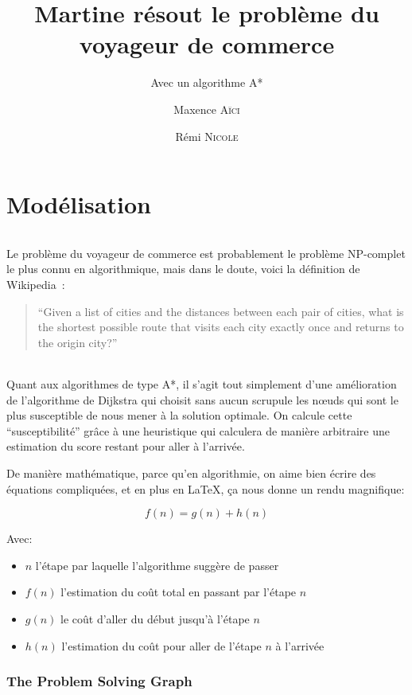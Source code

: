 \documentclass[french]{article}
\title{Martine résout le problème du voyageur de commerce}
\subtitle{Avec un algorithme A*}
\author{Maxence \textsc{Aïci} \and Rémi \textsc{Nicole}}
\begin{document}
\maketitle

\part{Modélisation}

\paragraph{}
Le problème du voyageur de commerce est probablement le problème NP-complet le
plus connu en algorithmique, mais dans le doute, voici la définition de
Wikipedia~\cite{wiki:tsp}:

\begin{quote}
	``Given a list of cities and the distances between each
	pair of cities, what is the shortest possible route that visits each city
	exactly once and returns to the origin city?''
\end{quote}

\paragraph{}
Quant aux algorithmes de type A*, il s'agit tout simplement d'une amélioration
de l'algorithme de Dijkstra qui choisit sans aucun scrupule les nœuds qui sont
le plus susceptible de nous mener à la solution optimale. On calcule cette
``susceptibilité'' grâce à une heuristique qui calculera de manière arbitraire
une estimation du score restant pour aller à l'arrivée.

De manière mathématique, parce qu'en algorithmie, on aime bien écrire des
équations compliquées, et en plus en \LaTeX, ça nous donne un rendu magnifique:

\[f(n) = g(n) + h(n)\]

Avec:
\begin{itemize}
	\item $n$ l'étape par laquelle l'algorithme suggère de passer
	\item $f(n)$ l'estimation du coût total en passant par l'étape $n$
	\item $g(n)$ le coût d'aller du début jusqu'à l'étape $n$
	\item $h(n)$ l'estimation du coût pour aller de l'étape $n$ à l'arrivée
\end{itemize}

\section{The Problem Solving Graph}
\end{document}
